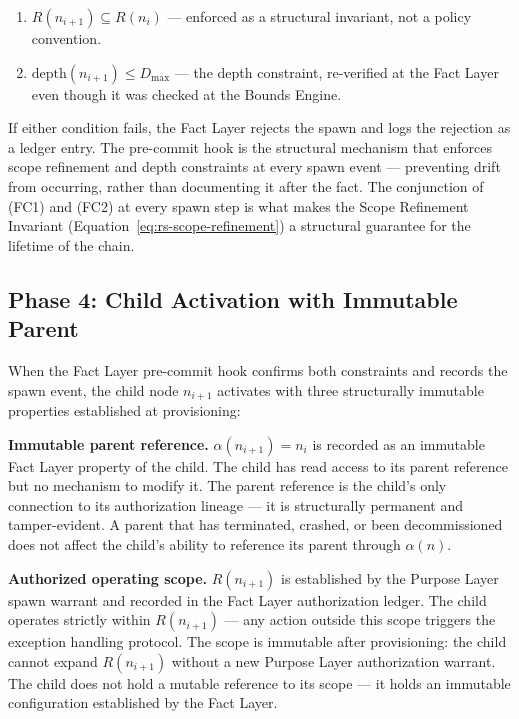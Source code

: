 \begin{enumerate}
    \item[(FC1)] $R(n_{i+1}) \subseteq R(n_i)$ — enforced as a structural invariant, not a policy convention.
    \item[(FC2)] $\text{depth}(n_{i+1}) \leq D_{\max}$ — the depth constraint, re-verified at the Fact Layer even though it was checked at the Bounds Engine.
\end{enumerate}

If either condition fails, the Fact Layer rejects the spawn and logs the rejection as a ledger entry. The pre-commit hook is the structural mechanism that enforces scope refinement and depth constraints at every spawn event — preventing drift from occurring, rather than documenting it after the fact. The conjunction of (FC1) and (FC2) at every spawn step is what makes the Scope Refinement Invariant (Equation~\ref{eq:rs-scope-refinement}) a structural guarantee for the lifetime of the chain.

\subsection{Phase 4: Child Activation with Immutable Parent}
\label{sec:rs-phase4}

When the Fact Layer pre-commit hook confirms both constraints and records the spawn event, the child node $n_{i+1}$ activates with three structurally immutable properties established at provisioning:

\medskip
\noindent\textbf{Immutable parent reference.} $\alpha(n_{i+1}) = n_i$ is recorded as an immutable Fact Layer property of the child. The child has read access to its parent reference but no mechanism to modify it. The parent reference is the child's only connection to its authorization lineage — it is structurally permanent and tamper-evident. A parent that has terminated, crashed, or been decommissioned does not affect the child's ability to reference its parent through $\alpha(n)$.

\medskip
\noindent\textbf{Authorized operating scope.} $R(n_{i+1})$ is established by the Purpose Layer spawn warrant and recorded in the Fact Layer authorization ledger. The child operates strictly within $R(n_{i+1})$ — any action outside this scope triggers the exception handling protocol. The scope is immutable after provisioning: the child cannot expand $R(n_{i+1})$ without a new Purpose Layer authorization warrant. The child does not hold a mutable reference to its scope — it holds an immutable configuration established by the Fact Layer.

